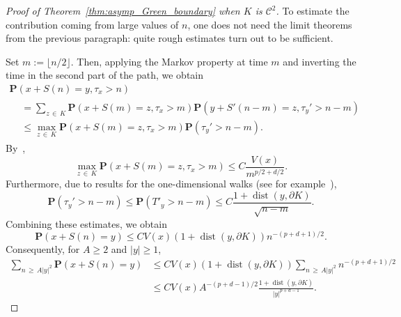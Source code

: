 \documentclass[10pt]{amsart}
\theoremstyle{definition}\newtheorem{defi}[theo]{Definition}\newtheorem{rema}[theo]{Remark}\newtheorem{exam}[theo]{Example}\newtheorem{exem}[theo]{Example}\newtheorem{nota}[theo]{Notation}
\DeclareMathOperator{\dist}{dist}
\newcommand{\clC}{\mathcal{C}}
\newcommand{\pr}{\mathbf{P}}
\renewcommand{\le}{\leqslant}
\renewcommand{\ge}{\geqslant}
\begin{document}
\begin{proof}[Proof of Theorem~\ref{thm:asymp_Green_boundary} when $K$ is $\clC^{2}$]
To estimate the contribution coming from large values of $n$, one does not need the limit theorems from the previous paragraph: quite rough estimates turn out to be sufficient.

Set $m:=\lfloor n/2\rfloor$. Then, applying the Markov property at time $m$ and inverting the time in the second part of the path, we obtain
\begin{multline*}
\pr\left(x+S(n)=y,\tau_x>n\right)\\
\begin{aligned}
&=\sum_{z\,\in\,K}\pr\left(x+S(m)=z,\tau_x>m\right)\pr\left(y+S'(n-m)=z,\tau_y'>n-m\right)\\
&\le\max_{z\,\in\,K}\pr\left(x+S(m)=z,\tau_x>m\right)\pr\left(\tau_y'>n-m\right).
\end{aligned}
\end{multline*}
By~\cite[Theorem~5]{DeWa-15},
\[
\max_{z\,\in\,K}\pr\left(x+S(m)=z,\tau_x>m\right)\le C\frac{V(x)}{m^{p/2+d/2}}.
\]
Furthermore, due to results for the one-dimensional walks (see for example~\cite[Lemma~3]{DeWa-16}),
\begin{equation}\label{3.step.1}
\pr\left(\tau_y'>n-m\right)\le \pr\left(T'_y>n-m\right)\le C\frac{1+\dist\left(y,\partial K\right)}{\sqrt{n-m}}.
\end{equation}
Combining these estimates, we obtain
\[
\pr\left(x+S(n)=y\right)\le CV(x)\left(1+\dist(y,\partial K)\right)n^{-(p+d+1)/2}.
\]
Consequently, for $A\ge2$ and $| y|\ge1$,
\begin{equation}\label{3.step}
\begin{aligned}
\sum_{n\,\ge\,A|y|^2}\pr\left(x+S(n)=y\right) &\le CV(x)\left(1+\dist(y,\partial K)\right)\sum_{n\,\ge\,A|y|^2}n^{-(p+d+1)/2}\\
&\le CV(x)A^{-(p+d-1)/2}\frac{1+\dist(y,\partial K)}{| y|^{p+d-1}}.
\end{aligned}
\end{equation}


\end{proof}
\end{document}
